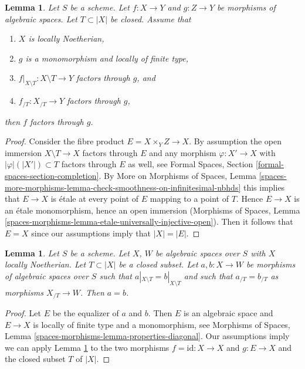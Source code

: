 \documentclass{stacks-project}
\theoremstyle{plain}
\newtheorem{lemma}[subsection]{Lemma}
\theoremstyle{definition}
\theoremstyle{remark}
\numberwithin{equation}{subsection}
\begin{document}
\begin{lemma}
\label{lemma-factor}
Let $S$ be a scheme. Let $f : X \to Y$ and $g : Z \to Y$ be morphisms
of algebraic spaces. Let $T \subset |X|$ be closed.
Assume that
\begin{enumerate}
\item $X$ is locally Noetherian,
\item $g$ is a monomorphism and locally of finite type,
\item $f|_{X \setminus T} : X \setminus T \to Y$ factors through $g$, and
\item $f_{/T} : X_{/T} \to Y$ factors through $g$,
\end{enumerate}
then $f$ factors through $g$.
\end{lemma}

\begin{proof}
Consider the fibre product $E = X \times_Y Z \to X$.
By assumption the open immersion $X \setminus T \to X$
factors through $E$ and any morphism $\varphi : X' \to X$ with
$|\varphi|(|X'|) \subset T$ factors through $E$ as well, see
Formal Spaces, Section \ref{formal-spaces-section-completion}.
By More on Morphisms of Spaces, Lemma
\ref{spaces-more-morphisms-lemma-check-smoothness-on-infinitesimal-nbhds}
this implies that $E \to X$ is \'etale at every point of $E$
mapping to a point of $T$. Hence $E \to X$ is an \'etale
monomorphism, hence an open immersion
(Morphisms of Spaces, Lemma
\ref{spaces-morphisms-lemma-etale-universally-injective-open}).
Then it follows that $E = X$ since our assumptions imply that $|X| = |E|$.
\end{proof}

\begin{lemma}
\label{lemma-faithful-general}
Let $S$ be a scheme. Let $X$, $W$ be algebraic spaces over $S$ with
$X$ locally Noetherian. Let $T \subset |X|$ be a closed subset.
Let $a, b : X \to W$ be morphisms of algebraic spaces over $S$ such
that $a|_{X \setminus T} = b|_{X \setminus T}$ and such that
$a_{/T} = b_{/T}$ as morphisms $X_{/T} \to W$. Then $a = b$.
\end{lemma}

\begin{proof}
Let $E$ be the equalizer of $a$ and $b$. Then $E$ is an algebraic space
and $E \to X$ is locally of finite type and a monomorphism, see
Morphisms of Spaces, Lemma \ref{spaces-morphisms-lemma-properties-diagonal}.
Our assumptions imply we can apply Lemma \ref{lemma-factor} to the two
morphisms $f = \text{id} : X \to X$ and $g : E \to X$ and the closed
subset $T$ of $|X|$.
\end{proof}
\end{document}
